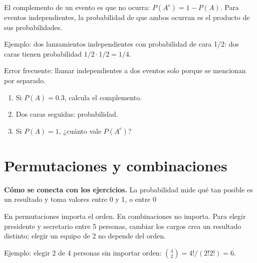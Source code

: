 \documentclass[10pt,oneside,openany]{book}
\begin{document}
El complemento de un evento es que no ocurra: $P(A^c)=1-P(A)$. Para eventos independientes, la probabilidad de que ambos ocurran es el producto de sus probabilidades.

\begin{ejemplo}
Ejemplo: dos lanzamientos independientes con probabilidad de cara 1/2: dos caras tienen probabilidad $1/2\cdot1/2=1/4$.
\end{ejemplo}

\begin{ojo}
Error frecuente: llamar independientes a dos eventos solo porque se mencionan por separado.
\end{ojo}

\begin{practica}

\begin{enumerate}

\item Si $P(A)=0.3$, calcula el complemento.

\item Dos caras seguidas: probabilidad.

\item Si $P(A)=1$, ¿cuánto vale $P(A^c)$?

\end{enumerate}

\end{practica}



\section{Permutaciones y combinaciones}

\textbf{Cómo se conecta con los ejercicios.} La probabilidad mide qué tan posible es un resultado y toma valores entre 0 y 1, o entre 0 %

En permutaciones importa el orden. En combinaciones no importa. Para elegir presidente y secretario entre 5 personas, cambiar los cargos crea un resultado distinto; elegir un equipo de 2 no depende del orden.

\begin{ejemplo}
Ejemplo: elegir 2 de 4 personas sin importar orden: $\binom42=4!/(2!2!)=6$.
\end{ejemplo}
\end{document}
